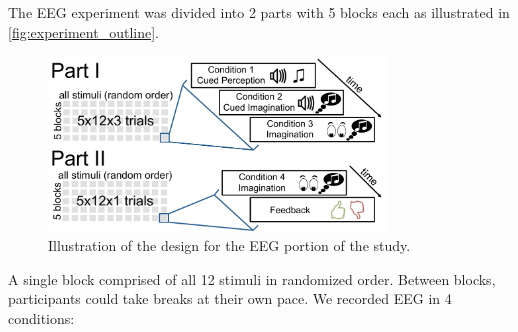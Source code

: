 The EEG experiment was divided into 2 parts with 5 blocks each as illustrated in \autoref{fig:experiment_outline}.
\begin{figure}
  \begin{center}
    \includegraphics[width=0.8\textwidth,keepaspectratio=true]{Figures/study_design_small.pdf}
    \caption{%
Illustration of the design for the EEG portion of the study.
}
    \label{fig:experiment_outline}
  \end{center}
\end{figure}

A single block comprised of all 12 stimuli in randomized order.
Between blocks, participants could take breaks at their own pace.
We recorded EEG in 4 conditions:

